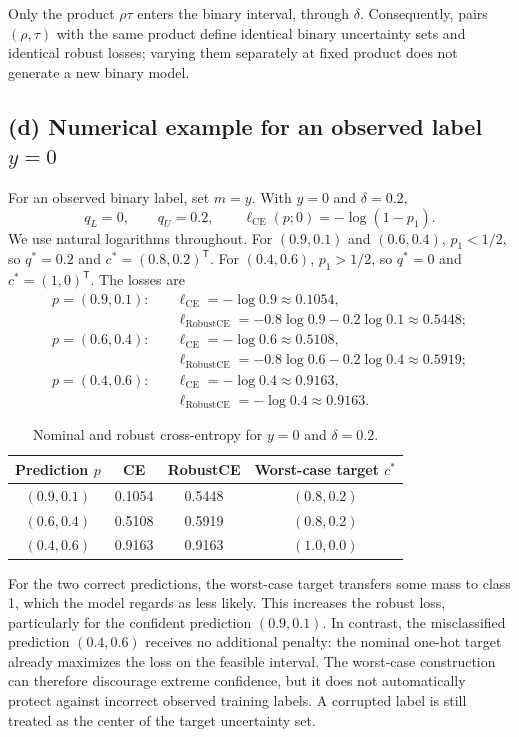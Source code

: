 \documentclass[11pt,a4paper]{article}
\newcommand{\CE}{\mathrm{CE}}
\newcommand{\RCE}{\mathrm{RobustCE}}
\begin{document}
Only the product $\rho\tau$ enters the binary interval, through $\delta$.
Consequently, pairs $(\rho,\tau)$ with the same product define identical
binary uncertainty sets and identical robust losses; varying them separately
at fixed product does not generate a new binary model.

\subsection*{(d) Numerical example for an observed label $y=0$}
For an observed binary label, set $m=y$. With $y=0$ and $\delta=0.2$,
\begin{equation}
    q_L=0,\qquad q_U=0.2,\qquad
    \ell_{\CE}(p;0)=-\log(1-p_1).
\end{equation}
We use natural logarithms throughout. For $(0.9,0.1)$ and $(0.6,0.4)$,
$p_1<1/2$, so $q^*=0.2$ and $c^*=(0.8,0.2)^{\mathsf T}$. For $(0.4,0.6)$,
$p_1>1/2$, so $q^*=0$ and $c^*=(1,0)^{\mathsf T}$. The losses are
\begin{align}
    p=(0.9,0.1):\quad &\ell_{\CE}=-\log0.9\approx0.1054,\\
    &\ell_{\RCE}=-0.8\log0.9-0.2\log0.1\approx0.5448;\\[2pt]
    p=(0.6,0.4):\quad &\ell_{\CE}=-\log0.6\approx0.5108,\\
    &\ell_{\RCE}=-0.8\log0.6-0.2\log0.4\approx0.5919;\\[2pt]
    p=(0.4,0.6):\quad &\ell_{\CE}=-\log0.4\approx0.9163,\\
    &\ell_{\RCE}=-\log0.4\approx0.9163.
\end{align}
\begin{table}[htbp]
\centering
\caption{Nominal and robust cross-entropy for $y=0$ and $\delta=0.2$.}
\begin{tabular}{@{}cccc@{}}
\toprule
Prediction $p$ & CE & RobustCE & Worst-case target $c^*$\\
\midrule
$(0.9,0.1)$ & 0.1054 & 0.5448 & $(0.8,0.2)$\\
$(0.6,0.4)$ & 0.5108 & 0.5919 & $(0.8,0.2)$\\
$(0.4,0.6)$ & 0.9163 & 0.9163 & $(1.0,0.0)$\\
\bottomrule
\end{tabular}
\end{table}

For the two correct predictions, the worst-case target transfers some mass to
class 1, which the model regards as less likely. This increases the robust loss,
particularly for the confident prediction $(0.9,0.1)$. In contrast, the
misclassified prediction $(0.4,0.6)$ receives no additional penalty: the
nominal one-hot target already maximizes the loss on the feasible interval.
The worst-case construction can therefore discourage extreme confidence, but
it does not automatically protect against incorrect observed training labels.
A corrupted label is still treated as the center of the target uncertainty set.
\end{document}
